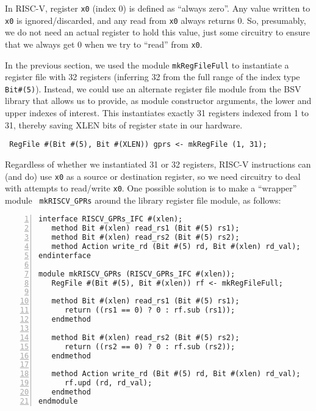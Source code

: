 
In RISC-V, register \verb|x0| (index 0) is defined as ``always zero''.
Any value written to \verb|x0| is ignored/discarded, and any read from
\verb|x0| always returns 0.  So, presumably, we do not need an actual
register to hold this value, just some circuitry to ensure that we
always get 0 when we try to ``read'' from \verb|x0|.

In the previous section, we used the module \verb|mkRegFileFull| to
instantiate a register file with 32 registers (inferring 32 from the
full range of the index type \verb|Bit#(5)|).  Instead, we could use
an alternate register file module from the BSV library that allows us
to provide, as module constructor arguments, the lower and upper
indexes of interest.  This instantiates exactly 31 registers indexed
from 1 to 31, thereby saving XLEN bits of register state in our
hardware.

\begin{tabbing}\small\tt
\hmm RegFile \#(Bit \#(5), Bit \#(XLEN)) gprs <- mkRegFile (1, 31);
\end{tabbing}

Regardless of whether we instantiated 31 or 32 registers, RISC-V
instructions can (and do) use {\tt x0} as a source or destination
register, so we need circuitry to deal with attempts to read/write
{\tt x0}.  One possible solution is to make a ``wrapper'' module {\tt
mkRISCV\_GPRs} around the library register file module, as follows:


{\small
\begin{Verbatim}[frame=single, numbers=left]
interface RISCV_GPRs_IFC #(xlen);
   method Bit #(xlen) read_rs1 (Bit #(5) rs1);
   method Bit #(xlen) read_rs2 (Bit #(5) rs2);
   method Action write_rd (Bit #(5) rd, Bit #(xlen) rd_val);
endinterface

module mkRISCV_GPRs (RISCV_GPRs_IFC #(xlen));
   RegFile #(Bit #(5), Bit #(xlen)) rf <- mkRegFileFull;

   method Bit #(xlen) read_rs1 (Bit #(5) rs1);
      return ((rs1 == 0) ? 0 : rf.sub (rs1));
   endmethod

   method Bit #(xlen) read_rs2 (Bit #(5) rs2);
      return ((rs2 == 0) ? 0 : rf.sub (rs2));
   endmethod

   method Action write_rd (Bit #(5) rd, Bit #(xlen) rd_val);
      rf.upd (rd, rd_val);
   endmethod
endmodule
\end{Verbatim}
}


